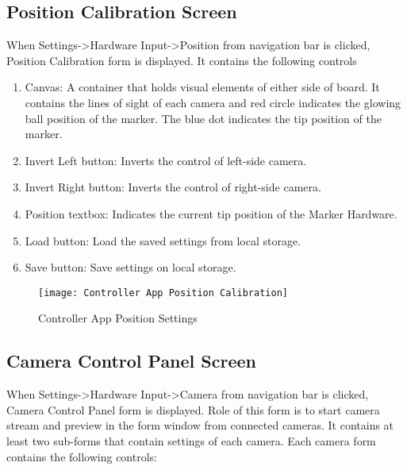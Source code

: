 \subsection{Position Calibration Screen}
When Settings->Hardware Input->Position from navigation bar is clicked, Position Calibration form is displayed. It contains the following controls

\begin{enumerate}

\item Canvas: A container that holds visual elements of either side of board. It contains the lines of sight of each camera and red circle indicates the glowing ball position of the marker. The blue dot indicates the tip position of the marker.
\item Invert Left button: Inverts the control of left-side camera.
\item Invert Right button: Inverts the control of right-side camera.
\item Position textbox: Indicates the current tip position of the Marker Hardware.
\item Load button: Load the saved settings from local storage.
\item Save button: Save settings on local storage.

\end{enumerate}

\newpage
\begin{figure}[h]
  \centering
  \texttt{[image: Controller App Position Calibration]}
  \caption{Controller App Position Settings}
\end{figure}

\subsection{Camera Control Panel Screen}
When Settings->Hardware Input->Camera from navigation bar is clicked, Camera Control Panel form is displayed. Role of this form is to start camera stream and preview in the form window from connected cameras. It contains at least two sub-forms that contain settings of each camera. Each camera form contains the following controls:

